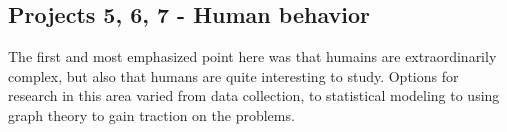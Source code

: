 \documentclass[12pt]{amsart}
\begin{document}
\begin{onehalfspace}
        \section{Projects 5, 6, 7 - Human behavior}
        The first and most emphasized point here was that humains are extraordinarily complex, but also that humans
        are quite interesting to study. Options for research in this area varied from data collection, to statistical
        modeling to using graph theory to gain traction on the problems.


    \end{onehalfspace}
\end{document}
